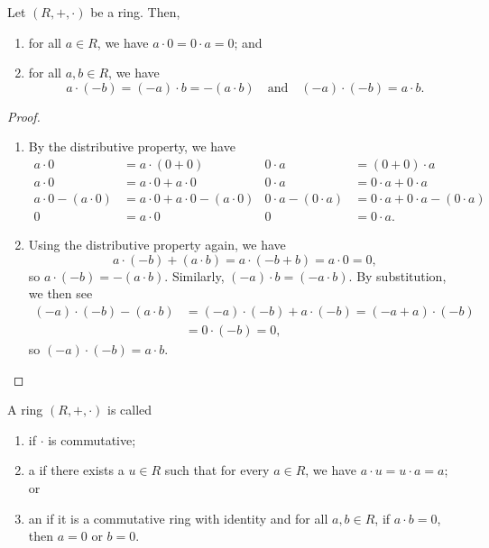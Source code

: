 \begin{prop}
Let $ (R,+,\cdot) $ be a ring. Then,
\begin{enumerate}
    \item for all $ a\in R $, we have $ a\cdot 0=0\cdot a=0 $; and
    \item for all $ a,b\in R $, we have
    \begin{equation*}
        a\cdot(-b)=(-a)\cdot b=-(a\cdot b) \quad\text{and}\quad (-a)\cdot(-b)=a\cdot b.
    \end{equation*}
\end{enumerate}
\end{prop}
\begin{proof}~
\begin{enumerate}
    \item By the distributive property, we have
    \begin{align*}
        a\cdot 0 &= a\cdot(0+0) & 0\cdot a &= (0+0)\cdot a \\
        a\cdot 0 &= a\cdot 0+a\cdot 0 & 0\cdot a &= 0\cdot a+0\cdot a \\
        a\cdot 0-(a\cdot 0) &= a\cdot 0+a\cdot 0-(a\cdot 0) & 0\cdot a-(0\cdot a) &= 0\cdot a+0\cdot a-(0\cdot a) \\
        0 &= a\cdot 0 & 0 &= 0\cdot a.
    \end{align*}

    \item Using the distributive property again, we have
    \begin{equation*}
        a\cdot(-b)+(a\cdot b)=a\cdot(-b+b)=a\cdot 0=0,
    \end{equation*}
    so $ a\cdot(-b)=-(a\cdot b) $. Similarly, $ (-a)\cdot b=(-a\cdot b) $. By substitution, we then see
    \begin{align*}
        (-a)\cdot(-b)-(a\cdot b) &= (-a)\cdot(-b)+a\cdot(-b)=(-a+a)\cdot(-b) \\
        &= 0\cdot(-b)=0,
    \end{align*}
    so $ (-a)\cdot(-b)=a\cdot b $.\qedhere
\end{enumerate}
\end{proof}

\begin{defn}\label{defn:ring_types}
A ring $ (R,+,\cdot) $ is called
\begin{enumerate}
    \item {} if $ \cdot $ is commutative;
    \item a  if there exists a $ u\in R $ such that for every $ a\in R $, we have $ a\cdot u=u\cdot a=a $; or
    \item an  if it is a commutative ring with identity and for all $ a,b\in R $, if $ a\cdot b=0 $, then $ a=0 $ or $ b=0 $.
\end{enumerate}
\end{defn}

